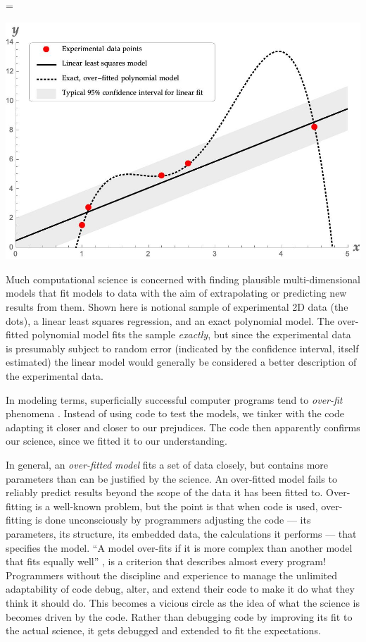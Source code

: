 \begin{figure\figureStarDetails}[t]
{ \newdimen \imageWidth 
  \imageWidth=\textwidth
  \imageWidthCalculation
  \begin{center}\includegraphics[width=\imageWidth]{
generated/mathematicaplot.jpg
}\end{center}}
\caption{Much computational science is concerned with finding plausible multi-dimensional models that fit models to data with the aim of extrapolating or predicting new results from them. Shown here is notional sample of experimental 2D data (the dots), a linear least squares regression, and an exact polynomial model. The over-fitted polynomial model fits the sample \emph{exactly\/}, but since the experimental data is presumably subject to random error (indicated by the confidence interval, itself estimated) the linear model would generally be considered a better description of the experimental data.}
\label{fig-overfit}
\end{figure\figureStarDetails}

In modeling terms, superficially successful computer programs tend to \emph{over-fit\/} phenomena \cite{over-fit}. Instead of using code to test the models, we tinker with the code adapting it closer and closer to our prejudices. The code then apparently confirms our science, since we fitted it to our understanding.  

In general, an \emph{over-fitted model\/} fits a set of data closely, but contains more parameters than can be justified by the science. An over-fitted model fails to reliably predict results beyond the scope of the data it has been fitted to. Over-fitting is a well-known problem, but the point is that when code is used, over-fitting is done unconsciously by programmers adjusting the code --- its parameters, its structure, its embedded data, the calculations it performs --- that specifies the model. ``A model over-fits if it is  more complex than another model that fits equally well'' \cite{over-fit}, is a criterion that describes almost every program! Programmers without the discipline and experience to manage the unlimited adaptability of code debug, alter, and extend their code to make it do what they think it should do. This becomes a vicious circle as the idea of what the science is becomes driven by the code. Rather than debugging code by improving its fit to the actual science, it gets debugged and extended to fit the expectations.  

